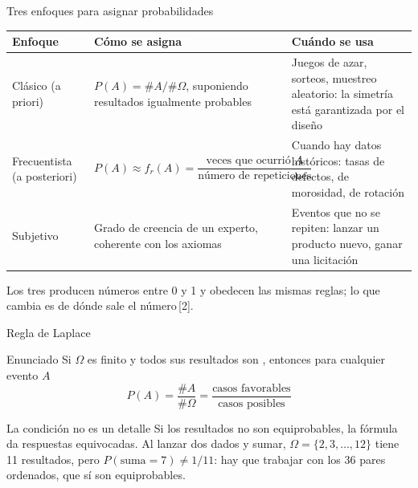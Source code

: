 \documentclass[aspectratio=169,10pt]{beamer}
\begin{document}
\begin{frame}{Tres enfoques para asignar probabilidades}
  \footnotesize
  \begin{center}
  \begin{tabular}{@{}p{2.4cm}p{4.6cm}p{4.6cm}@{}}
    \toprule
    \textbf{Enfoque} & \textbf{Cómo se asigna} & \textbf{Cuándo se usa} \\
    \midrule
    Clásico \newline (a priori) &
      $P(A)=\#A/\#\Omega$, suponiendo resultados igualmente probables &
      Juegos de azar, sorteos, muestreo aleatorio: la simetría está garantizada
      por el diseño \\
    \addlinespace
    Frecuentista \newline (a posteriori) &
      $P(A)\approx f_r(A)=\dfrac{\text{veces que ocurrió }A}{\text{número de repeticiones}}$ &
      Cuando hay datos históricos: tasas de defectos, de morosidad, de rotación \\
    \addlinespace
    Subjetivo &
      Grado de creencia de un experto, coherente con los axiomas &
      Eventos que no se repiten: lanzar un producto nuevo, ganar una licitación \\
    \bottomrule
  \end{tabular}
  \end{center}

  \vspace{0.15cm}
  {\scriptsize\color{uniGris} Los tres producen números entre 0 y 1 y obedecen
  las mismas reglas; lo que cambia es de dónde sale el número\,[2].}
\end{frame}

\begin{frame}{Regla de Laplace}
  \begin{block}{Enunciado}
    \small
    Si $\Omega$ es finito y todos sus resultados son , entonces para cualquier evento $A$
    \[ P(A)=\frac{\#A}{\#\Omega}
          =\frac{\text{casos favorables}}{\text{casos posibles}} \]
  \end{block}

  \vspace{0.2cm}
  \begin{alertblock}{La condición no es un detalle}
    \footnotesize
    Si los resultados no son equiprobables, la fórmula da respuestas
    equivocadas. Al lanzar dos dados y sumar, $\Omega=\{2,3,\dots,12\}$ tiene 11
    resultados, pero $P(\text{suma}=7)\neq 1/11$: hay que trabajar con los 36
    pares ordenados, que sí son equiprobables.
  \end{alertblock}
\end{frame}
\end{document}
